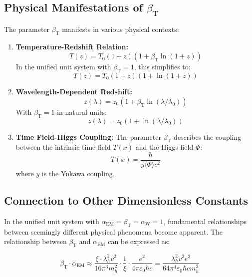 \documentclass[12pt,a4paper]{article}
\newcommand{\Tfield}{T(x)}
\newcommand{\betaT}{\beta_{\text{T}}}
\newcommand{\alphaEM}{\alpha_{\text{EM}}}
\newcommand{\alphaW}{\alpha_{\text{W}}}
\begin{document}
	\subsection{Physical Manifestations of \(\betaT\)}
	
	The parameter \(\betaT\) manifests in various physical contexts:
	
	\begin{enumerate}
		\item \textbf{Temperature-Redshift Relation:} 
		\begin{equation}
			T(z) = T_0 (1 + z) (1 + \betaT \ln(1 + z))
		\end{equation}
		In the unified unit system with \(\betaT = 1\), this simplifies to:
		\begin{equation}
			T(z) = T_0 (1 + z) (1 + \ln(1 + z))
		\end{equation}
		\item \textbf{Wavelength-Dependent Redshift:} 
		\begin{equation}
			z(\lambda) = z_0 (1 + \betaT \ln(\lambda/\lambda_0))
		\end{equation}
		With \(\betaT = 1\) in natural units:
		\begin{equation}
			z(\lambda) = z_0 (1 + \ln(\lambda/\lambda_0))
		\end{equation}
		\item \textbf{Time Field-Higgs Coupling:} The parameter \(\betaT\) describes the coupling between the intrinsic time field \(\Tfield\) and the Higgs field \(\Phi\):
		\begin{equation}
			\Tfield = \frac{\hbar}{y \langle \Phi \rangle c^2}
		\end{equation}
		where \(y\) is the Yukawa coupling.
	\end{enumerate}
	
	\subsection{Connection to Other Dimensionless Constants}
	
	In the unified unit system with \(\alphaEM = \betaT = \alphaW = 1\), fundamental relationships between seemingly different physical phenomena become apparent. The relationship between \(\betaT\) and \(\alphaEM\) can be expressed as:
	
	\begin{equation}
		\betaT \cdot \alphaEM \approx \frac{\xi \cdot \lambda_h^2 v^2}{16\pi^3 m_h^2} \cdot \frac{1}{\xi} \cdot \frac{e^2}{4\pi\varepsilon_0\hbar c} = \frac{\lambda_h^2 v^2 e^2}{64\pi^4\varepsilon_0\hbar c m_h^2}
	\end{equation}
	
\end{document}
